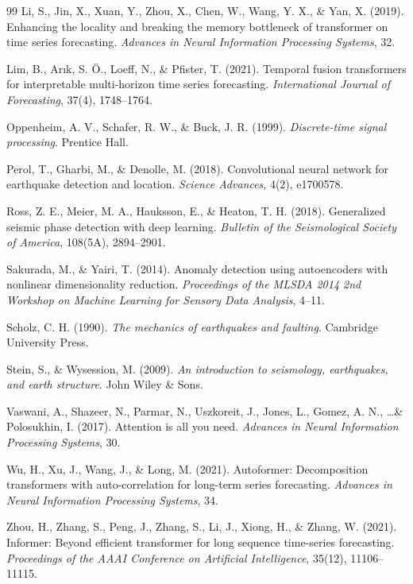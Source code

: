 \begin{thebibliography}{99}
Li, S., Jin, X., Xuan, Y., Zhou, X., Chen, W., Wang, Y. X., \& Yan, X. (2019). Enhancing the locality and breaking the memory bottleneck of transformer on time series forecasting. \textit{Advances in Neural Information Processing Systems}, 32.

Lim, B., Arık, S. Ö., Loeff, N., \& Pfister, T. (2021). Temporal fusion transformers for interpretable multi-horizon time series forecasting. \textit{International Journal of Forecasting}, 37(4), 1748--1764.

Oppenheim, A. V., Schafer, R. W., \& Buck, J. R. (1999). \textit{Discrete-time signal processing}. Prentice Hall.

Perol, T., Gharbi, M., \& Denolle, M. (2018). Convolutional neural network for earthquake detection and location. \textit{Science Advances}, 4(2), e1700578.

Ross, Z. E., Meier, M. A., Hauksson, E., \& Heaton, T. H. (2018). Generalized seismic phase detection with deep learning. \textit{Bulletin of the Seismological Society of America}, 108(5A), 2894--2901.

Sakurada, M., \& Yairi, T. (2014). Anomaly detection using autoencoders with nonlinear dimensionality reduction. \textit{Proceedings of the MLSDA 2014 2nd Workshop on Machine Learning for Sensory Data Analysis}, 4--11.

Scholz, C. H. (1990). \textit{The mechanics of earthquakes and faulting}. Cambridge University Press.

Stein, S., \& Wysession, M. (2009). \textit{An introduction to seismology, earthquakes, and earth structure}. John Wiley \& Sons.

Vaswani, A., Shazeer, N., Parmar, N., Uszkoreit, J., Jones, L., Gomez, A. N., \ldots \& Polosukhin, I. (2017). Attention is all you need. \textit{Advances in Neural Information Processing Systems}, 30.

Wu, H., Xu, J., Wang, J., \& Long, M. (2021). Autoformer: Decomposition transformers with auto-correlation for long-term series forecasting. \textit{Advances in Neural Information Processing Systems}, 34.

Zhou, H., Zhang, S., Peng, J., Zhang, S., Li, J., Xiong, H., \& Zhang, W. (2021). Informer: Beyond efficient transformer for long sequence time-series forecasting. \textit{Proceedings of the AAAI Conference on Artificial Intelligence}, 35(12), 11106--11115.

\end{thebibliography}

